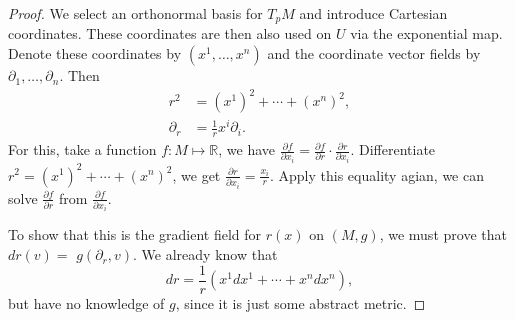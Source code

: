 \begin{proof}
	We select an orthonormal basis for \( T _ { p } M \) and introduce
	Cartesian coordinates.
	These coordinates are then also used on \( U \) via the exponential map.
	Denote these coordinates by \( \left( x ^ { 1 } , \ldots , x ^ { n } \right) \) and the coordinate vector fields by
	\( \partial _ { 1 } , \ldots , \partial _ { n } . \)
	Then
	\begin{align*}
		r ^ { 2 }        & = \left( x ^ { 1 } \right) ^ { 2 } + \cdots + \left( x ^ { n } \right) ^ { 2 } , \\
		\partial _ { r } & = \frac { 1 } { r } x ^ { i } \partial _ { i }.
	\end{align*}
	For this, take a function $f: M \mapsto \mathbb{R}$, we have $ \frac{\partial f}{\partial x_i}=\frac{\partial f}{\partial r}\cdot \frac{\partial r}{\partial x_i}$.
	Differentiate $ r ^ { 2 } = \left( x ^ { 1 } \right) ^ { 2 } + \cdots + \left( x ^ { n } \right) ^ { 2 } $, we get $\frac{\partial r}{\partial x_i} = \frac{x_i}{r} $.
	Apply this equality agian, we can solve $\frac{\partial f}{\partial r}$ from $\frac{\partial f}{\partial x_i}$.

	To show that this is the gradient field for \( r ( x ) \) on \( ( M , g ) \), we must prove that \( d r ( v ) = \)
	\( g \left( \partial _ { r } , v \right) . \)
	We already know that
	\[
		d r = \frac { 1 } { r } \left( x ^ { 1 } d x ^ { 1 } + \cdots + x ^ { n } d x ^ { n } \right),
	\]
	but have no knowledge of $g$, since it is just some abstract metric.


\end{proof}
